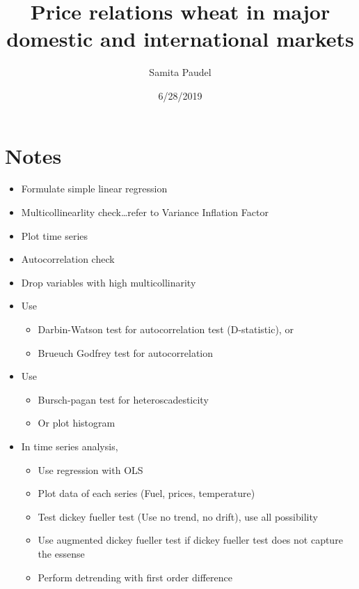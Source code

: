 \documentclass[
  12pt,
]{article}
\title{Price relations wheat in major domestic and international markets}
\author{Samita Paudel}
\date{6/28/2019}
\providecommand{\tightlist}{%
  \setlength{\itemsep}{0pt}\setlength{\parskip}{0pt}}
\begin{document}
\maketitle

\hypertarget{notes}{%
\section{Notes}\label{notes}}

\begin{itemize}
\tightlist
\item
  Formulate simple linear regression
\item
  Multicollinearlity check\ldots{}refer to Variance Inflation Factor
\item
  Plot time series
\item
  Autocorrelation check
\item
  Drop variables with high multicollinarity
\item
  Use

  \begin{itemize}
  \tightlist
  \item
    Darbin-Watson test for autocorrelation test (D-statistic), or
  \item
    Brueuch Godfrey test for autocorrelation
  \end{itemize}
\item
  Use

  \begin{itemize}
  \tightlist
  \item
    Bursch-pagan test for heteroscadesticity
  \item
    Or plot histogram
  \end{itemize}
\item
  In time series analysis,

  \begin{itemize}
  \tightlist
  \item
    Use regression with OLS
  \item
    Plot data of each series (Fuel, prices, temperature)
  \item
    Test dickey fueller test (Use no trend, no drift), use all possibility
  \item
    Use augmented dickey fueller test if dickey fueller test does not capture the essense
  \item
    Perform detrending with first order difference
  \end{itemize}
\end{itemize}
\end{document}
